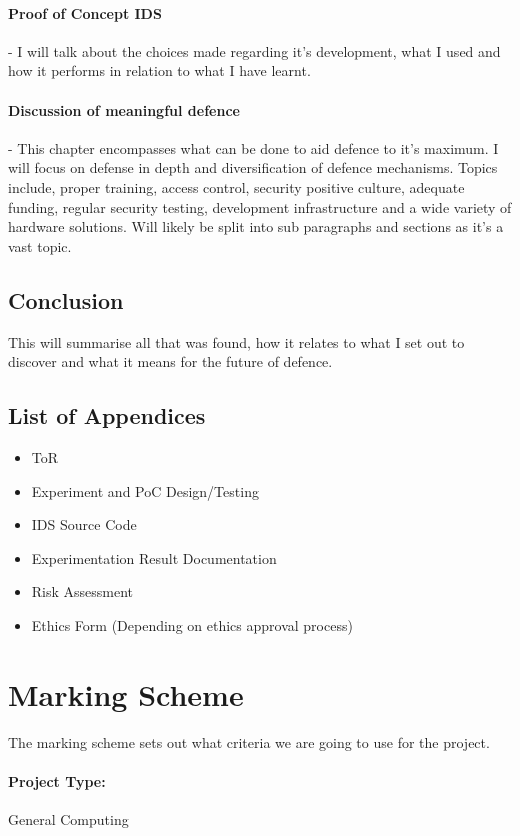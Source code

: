 \paragraph{Proof of Concept IDS} - I will talk about the choices made regarding it's development, what I used and how it performs in relation to what I have learnt.

\paragraph{Discussion of meaningful defence} - This chapter encompasses what can be done to aid defence to it's maximum. I will focus on defense in depth and diversification of defence mechanisms. 
Topics include, proper training, access control, security positive culture, adequate funding, regular security testing, development infrastructure and a wide variety of hardware solutions. 
Will likely be split into sub paragraphs and sections as it's a vast topic.

\subsection{Conclusion} This will summarise all that was found, how it relates to what I set out to discover and what it means for the future of defence. 

\subsection{List of Appendices}
\begin{itemize}
	\item ToR
	\item Experiment and PoC Design/Testing
	\item IDS Source Code
	\item Experimentation Result Documentation
	\item Risk Assessment
	\item Ethics Form (Depending on ethics approval process)
\end{itemize}

\section{Marking Scheme}
The marking scheme sets out what criteria we are going to use for the project.

\paragraph{Project Type:} General Computing

